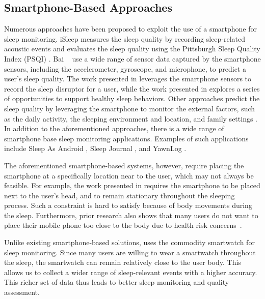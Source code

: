 \subsection{Smartphone-Based Approaches}
Numerous approaches have been proposed to exploit the use of a smartphone for sleep monitoring. iSleep \cite{hao2013isleep} measures the
sleep quality by recording sleep-related acoustic events and evaluates the sleep quality using the Pittsburgh Sleep Quality Index (PSQI)
\cite{carpenter1998psychometric}. Bai \etal~\cite{bai2012will} use a wide range of sensor data captured by the smartphone sensors,
including the accelerometer, gyroscope, and microphone, to predict a user's sleep quality. The work presented in \cite{kay2012lullaby}
leverages the smartphone sensors to record the sleep disruptor for a user, while the work presented in \cite{choe2011opportunities}
explores a series of opportunities to support healthy sleep behaviors. Other approaches predict the sleep quality by leveraging the
smartphone to monitor the external factors, such as the daily activity, the sleeping environment and location, and family settings
\cite{chen2013unobtrusive,zhang2013real}. In addition to the aforementioned approaches, there is a wide range of smartphone base sleep
monitoring applications. Examples of such applications include Sleep As Android \cite{SleepAndroid}, Sleep Journal \cite{SleepJournal}, and
YawnLog \cite{YawnLog}.

The aforementioned smartphone-based systems, however, require placing the smartphone at a specifically location near to the user, which may
not always be feasible. For example, the work presented in \cite{gu2016sleep} requires the smartphone to be placed next to the user's head,
and to remain stationary throughout the sleeping process. Such a constraint is hard to satisfy because of body movements during the sleep.
Furthermore, prior research also shows that many users do not want to place their mobile phone too close to the body due to health risk
concerns~\cite{StepHealth,Quorasleep}.

Unlike existing smartphone-based solutions, \systemname uses the commodity smartwatch for sleep monitoring. Since many users are willing to
wear a smartwatch throughout the sleep, the smartwatch can remain relatively close to the user body. This allows us to collect a wider
range of sleep-relevant events with a higher accuracy. This richer set of data thus leads to better sleep monitoring and quality
assessment.

